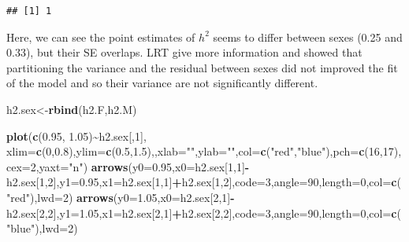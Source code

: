 \documentclass[
  12pt,
]{book}
\newenvironment{Shaded}{\begin{snugshade}}{\end{snugshade}}
\newcommand{\DataTypeTok}[1]{\textcolor[rgb]{0.13,0.29,0.53}{#1}}
\newcommand{\DecValTok}[1]{\textcolor[rgb]{0.00,0.00,0.81}{#1}}
\newcommand{\FloatTok}[1]{\textcolor[rgb]{0.00,0.00,0.81}{#1}}
\newcommand{\KeywordTok}[1]{\textcolor[rgb]{0.13,0.29,0.53}{\textbf{#1}}}
\newcommand{\NormalTok}[1]{#1}
\newcommand{\OperatorTok}[1]{\textcolor[rgb]{0.81,0.36,0.00}{\textbf{#1}}}
\newcommand{\StringTok}[1]{\textcolor[rgb]{0.31,0.60,0.02}{#1}}
\begin{document}
\begin{verbatim}
## [1] 1
\end{verbatim}

Here, we can see the point estimates of \(h^2\) seems to differ between sexes (0.25 and 0.33), but their SE overlaps.
LRT give more information and showed that partitioning the variance and the residual between sexes did not improved the fit of the model and so their variance are not significantly different.

\begin{Shaded}
\begin{Highlighting}[]
\NormalTok{h2.sex\textless{}{-}}\KeywordTok{rbind}\NormalTok{(h2.F,h2.M)}

\KeywordTok{plot}\NormalTok{(}\KeywordTok{c}\NormalTok{(}\FloatTok{0.95}\NormalTok{, }\FloatTok{1.05}\NormalTok{)}\OperatorTok{\textasciitilde{}}\NormalTok{h2.sex[,}\DecValTok{1}\NormalTok{], }\DataTypeTok{xlim=}\KeywordTok{c}\NormalTok{(}\DecValTok{0}\NormalTok{,}\FloatTok{0.8}\NormalTok{),}\DataTypeTok{ylim=}\KeywordTok{c}\NormalTok{(}\FloatTok{0.5}\NormalTok{,}\FloatTok{1.5}\NormalTok{),,}\DataTypeTok{xlab=}\StringTok{""}\NormalTok{,}\DataTypeTok{ylab=}\StringTok{""}\NormalTok{,}\DataTypeTok{col=}\KeywordTok{c}\NormalTok{(}\StringTok{"red"}\NormalTok{,}\StringTok{"blue"}\NormalTok{),}\DataTypeTok{pch=}\KeywordTok{c}\NormalTok{(}\DecValTok{16}\NormalTok{,}\DecValTok{17}\NormalTok{),}\DataTypeTok{cex=}\DecValTok{2}\NormalTok{,}\DataTypeTok{yaxt=}\StringTok{"n"}\NormalTok{)}
\KeywordTok{arrows}\NormalTok{(}\DataTypeTok{y0=}\FloatTok{0.95}\NormalTok{,}\DataTypeTok{x0=}\NormalTok{h2.sex[}\DecValTok{1}\NormalTok{,}\DecValTok{1}\NormalTok{]}\OperatorTok{{-}}\NormalTok{h2.sex[}\DecValTok{1}\NormalTok{,}\DecValTok{2}\NormalTok{],}\DataTypeTok{y1=}\FloatTok{0.95}\NormalTok{,}\DataTypeTok{x1=}\NormalTok{h2.sex[}\DecValTok{1}\NormalTok{,}\DecValTok{1}\NormalTok{]}\OperatorTok{+}\NormalTok{h2.sex[}\DecValTok{1}\NormalTok{,}\DecValTok{2}\NormalTok{],}\DataTypeTok{code=}\DecValTok{3}\NormalTok{,}\DataTypeTok{angle=}\DecValTok{90}\NormalTok{,}\DataTypeTok{length=}\DecValTok{0}\NormalTok{,}\DataTypeTok{col=}\KeywordTok{c}\NormalTok{(}\StringTok{"red"}\NormalTok{),}\DataTypeTok{lwd=}\DecValTok{2}\NormalTok{)}
\KeywordTok{arrows}\NormalTok{(}\DataTypeTok{y0=}\FloatTok{1.05}\NormalTok{,}\DataTypeTok{x0=}\NormalTok{h2.sex[}\DecValTok{2}\NormalTok{,}\DecValTok{1}\NormalTok{]}\OperatorTok{{-}}\NormalTok{h2.sex[}\DecValTok{2}\NormalTok{,}\DecValTok{2}\NormalTok{],}\DataTypeTok{y1=}\FloatTok{1.05}\NormalTok{,}\DataTypeTok{x1=}\NormalTok{h2.sex[}\DecValTok{2}\NormalTok{,}\DecValTok{1}\NormalTok{]}\OperatorTok{+}\NormalTok{h2.sex[}\DecValTok{2}\NormalTok{,}\DecValTok{2}\NormalTok{],}\DataTypeTok{code=}\DecValTok{3}\NormalTok{,}\DataTypeTok{angle=}\DecValTok{90}\NormalTok{,}\DataTypeTok{length=}\DecValTok{0}\NormalTok{,}\DataTypeTok{col=}\KeywordTok{c}\NormalTok{(}\StringTok{"blue"}\NormalTok{),}\DataTypeTok{lwd=}\DecValTok{2}\NormalTok{)}

\end{Highlighting}
\end{Shaded}
\end{document}
